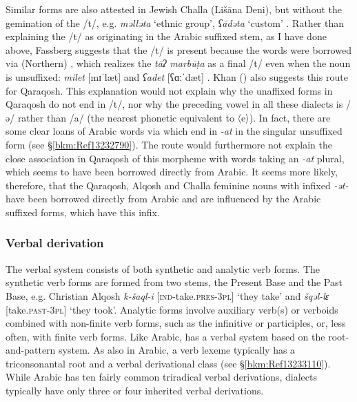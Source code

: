 \documentclass[output=paper]{langsci/langscibook}
\begin{document}
Similar forms are also attested in Jewish Challa (Lišāna Deni), but without the gemination of the /t/, e.g. \textit{məlləta} ‘ethnic group’, \textit{ʕādəta} ‘custom’ \citep[52]{Fassberg2010}. Rather than explaining the /t/ as originating in the Arabic suffixed {stem}, as I have done above, Fassberg suggests that the /t/ is present because the words were borrowed via ({Northern}) , which realizes the \textit{tāʔ} \textit{marbūṭa} as a final /t/ even when the noun is unsuffixed: \textit{milet} [mɪˈlæt] and \textit{ʕadet} [ʕɑːˈdæt] \citep[387]{Chyet2003}. Khan (\citeyear[206]{Khan2002}) also suggests this route for Qaraqosh. This explanation would not explain why the unaffixed forms in Qaraqosh do not end in /t/, nor why the preceding vowel in all these dialects is /ə/ rather than /a/ (the nearest phonetic equivalent to  〈e〉). In fact, there are some clear loans of Arabic words via  which end in \textit{{}-at} in the singular unsuffixed form (see §\ref{bkm:Ref13232790}). The  route would furthermore not explain the close association in Qaraqosh of this morpheme with words taking an \textit{\nobreakdash-at} plural, which seems to have been borrowed directly from Arabic. It seems more likely, therefore, that the Qaraqosh, Alqosh and Challa feminine nouns with infixed \textit{\nobreakdash-ət\nobreakdash-} have been borrowed directly from Arabic and are influenced by the Arabic suffixed forms, which have this infix.



\subsubsection{\label{bkm:Ref13233345}Verbal derivation}\largerpage

The  verbal system consists of both synthetic and analytic verb forms. The synthetic verb forms are formed from two stems, the Present Base and the Past Base, e.g. Christian Alqosh \textit{k\nobreakdash-šaql\nobreakdash-i} [\textsc{ind\nobreakdash-}take.\textsc{pres\nobreakdash-3pl]} ‘they take’ and \textit{šqəl\nobreakdash-lɛ} [take.\textsc{past\nobreakdash-3pl}] ‘they took’. Analytic forms involve {auxiliary verb(s)} or verboids combined with non-finite verb forms, such as the {infinitive} or participles, or, less often, with finite verb forms. Like Arabic,  has a verbal system based on the {root-and-pattern} system. As also in Arabic, a verb lexeme typically has a {triconsonantal} {root} and a verbal {derivational} class (see §\ref{bkm:Ref13233110}). While  Arabic has ten fairly common triradical verbal derivations,  dialects typically have only three or four inherited verbal derivations.
\end{document}
